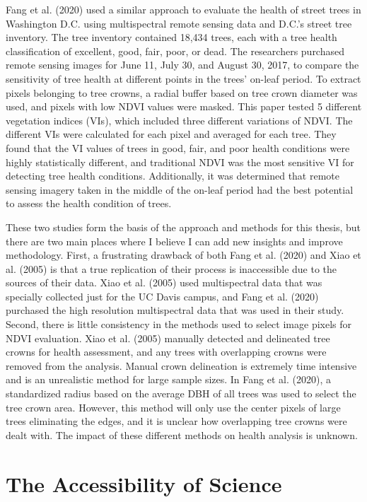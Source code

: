 \documentclass[12pt,twoside]{reedthesis}
\begin{document}
Fang et al. (2020) used a similar approach to evaluate the health of street trees
in Washington D.C. using multispectral remote sensing data and D.C.'s
street tree inventory. The tree inventory contained 18,434 trees, each
with a tree health classification of excellent, good, fair, poor, or
dead. The researchers purchased remote sensing images for June 11, July
30, and August 30, 2017, to compare the sensitivity of tree health at
different points in the trees' on-leaf period. To extract pixels
belonging to tree crowns, a radial buffer based on tree crown diameter
was used, and pixels with low NDVI values were masked. This paper tested
5 different vegetation indices (VIs), which included three different
variations of NDVI. The different VIs were calculated for each pixel and
averaged for each tree. They found that the VI values of trees in good,
fair, and poor health conditions were highly statistically different,
and traditional NDVI was the most sensitive VI for detecting tree health
conditions. Additionally, it was determined that remote sensing imagery
taken in the middle of the on-leaf period had the best potential to
assess the health condition of trees.

These two studies form the basis of the approach and methods for this
thesis, but there are two main places where I believe I can add new
insights and improve methodology. First, a frustrating drawback of both
Fang et al. (2020) and Xiao et al. (2005) is that a true replication of their process is
inaccessible due to the sources of their data. Xiao et al. (2005) used
multispectral data that was specially collected just for the UC Davis
campus, and Fang et al. (2020) purchased the high resolution multispectral data
that was used in their study. Second, there is little consistency in the
methods used to select image pixels for NDVI evaluation. Xiao et al. (2005)
manually detected and delineated tree crowns for health assessment, and
any trees with overlapping crowns were removed from the analysis. Manual
crown delineation is extremely time intensive and is an unrealistic
method for large sample sizes. In Fang et al. (2020), a standardized radius based
on the average DBH of all trees was used to select the tree crown area.
However, this method will only use the center pixels of large trees
eliminating the edges, and it is unclear how overlapping tree crowns
were dealt with. The impact of these different methods on health
analysis is unknown.

\hypertarget{the-accessibility-of-science}{%
\section{The Accessibility of Science}\label{the-accessibility-of-science}}
\end{document}
